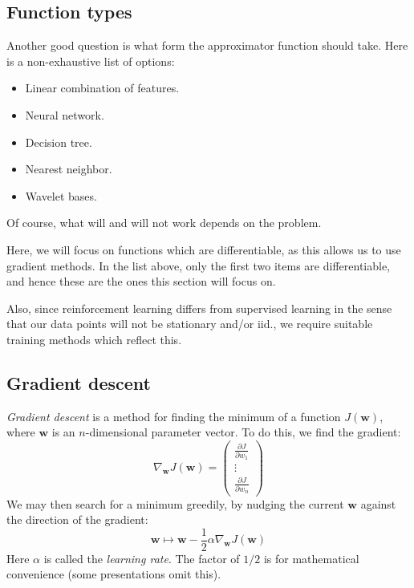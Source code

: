 \documentclass[12pt, a4paper]{article}
\numberwithin{equation}{section}
\begin{document}
\subsection{Function types}
Another good question is what form the approximator function should take. Here is a non-exhaustive list of options:
\begin{itemize}
\item Linear combination of features.
\item Neural network.
\item Decision tree.
\item Nearest neighbor.
\item Wavelet bases.
\end{itemize}
Of course, what will and will not work depends on the problem.

Here, we will focus on functions which are differentiable, as this allows us to use gradient methods. In the list above, only the first two items are differentiable, and hence these are the ones this section will focus on.

Also, since reinforcement learning differs from supervised learning in the sense that our data points will not be stationary and/or iid., we require suitable training methods which reflect this.

\subsection{Gradient descent}
\textit{Gradient descent} is a method for finding the minimum of a function $J(\mathbf{w})$, where $\mathbf{w}$ is an $n$-dimensional parameter vector. To do this, we find the gradient:
\begin{equation}
\nabla_\mathbf{w}J(\mathbf{w})=
\begin{pmatrix}
\frac{\partial J}{\partial w_1} \\
\vdots \\
\frac{\partial J}{\partial w_n}
\end{pmatrix}
\end{equation}
We may then search for a minimum greedily, by nudging the current $\mathbf{w}$ against the direction of the gradient:
\begin{equation}
\mathbf{w}\mapsto\mathbf{w}-\frac{1}{2}\alpha\nabla_\mathbf{w}J(\mathbf{w})
\end{equation}
Here $\alpha$ is called the \textit{learning rate}. The factor of $1/2$ is for mathematical convenience (some presentations omit this).
\end{document}

